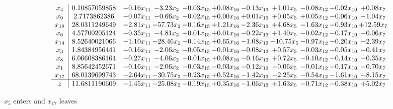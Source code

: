 \documentclass[9pt]{article}
\begin{document}
 \[\begin{array}{c| c c@{\hskip 2pt} c@{\hskip 2pt} c@{\hskip 2pt} c@{\hskip 2pt} c@{\hskip 2pt} c@{\hskip 2pt} c@{\hskip 2pt} c@{\hskip 2pt} c@{\hskip 2pt} }
 x_{4}   &  0.10857059858 & -0.16 x_{11} & -3.23 x_{2} & -0.03 x_{15} & +  0.08 x_{16} & -0.13 x_{13} & +  1.01 x_{5} & -0.08 x_{12} & -0.02 x_{10} & +  0.08 x_{7}\\
 x_{9}   &  2.7173862386 & -0.07 x_{11} & -0.66 x_{2} & -0.02 x_{15} & +  0.00 x_{16} & +  0.01 x_{13} & +  0.05 x_{5} & +  0.05 x_{12} & -0.06 x_{10} & -1.04 x_{7}\\
 x_{18}   &  28.0311249649 & -2.81 x_{11} & -57.73 x_{2} & -0.16 x_{15} & +  1.21 x_{16} & -2.36 x_{13} & +  4.68 x_{5} & -1.63 x_{12} & -0.93 x_{10} & + 12.59 x_{7}\\
 x_{6}   &  4.57700205124 & -0.35 x_{11} & -4.81 x_{2} & +  0.01 x_{15} & +  0.01 x_{16} & -0.22 x_{13} & +  1.40 x_{5} & -0.02 x_{12} & -0.17 x_{10} & -0.06 x_{7}\\
 x_{14}   &  8.52640021066 & -1.10 x_{11} & -28.46 x_{2} & -0.14 x_{15} & +  0.65 x_{16} & -1.08 x_{13} & + 10.75 x_{5} & -0.97 x_{12} & -0.20 x_{10} & -2.39 x_{7}\\
 x_{3}   &  1.84384956441 & -0.16 x_{11} & -2.06 x_{2} & -0.05 x_{15} & -0.01 x_{16} & -0.08 x_{13} & +  0.57 x_{5} & -0.03 x_{12} & -0.05 x_{10} & -0.41 x_{7}\\
 x_{8}   &  6.06608386164 & -0.27 x_{11} & -4.06 x_{2} & +  0.01 x_{15} & +  0.08 x_{16} & -0.16 x_{13} & +  0.72 x_{5} & -0.10 x_{12} & -0.14 x_{10} & -0.35 x_{7}\\
 x_{1}   &  8.85642452671 & -0.16 x_{11} & -2.06 x_{2} & -0.03 x_{15} & -0.03 x_{16} & -0.12 x_{13} & -0.06 x_{5} & -0.01 x_{12} & -0.17 x_{10} & -0.70 x_{7}\\
 x_{17}   &  68.0139699743 & -2.64 x_{11} & -30.75 x_{2} & +  0.23 x_{15} & +  0.52 x_{16} & -1.42 x_{13} & -2.25 x_{5} & -0.54 x_{12} & -1.61 x_{10} & -8.15 x_{7}\\
\hline
z    &  11.6811190609 & -1.45 x_{11} & -25.08 x_{2} & -0.19 x_{15} & +  0.35 x_{16} & -1.06 x_{13} & +  1.63 x_{5} & -0.71 x_{12} & -0.38 x_{10} & +  5.02 x_{7}\\
\end{array}\]


 $ x_{5} $ enters and $ x_{17} $ leaves 
\end{document}
